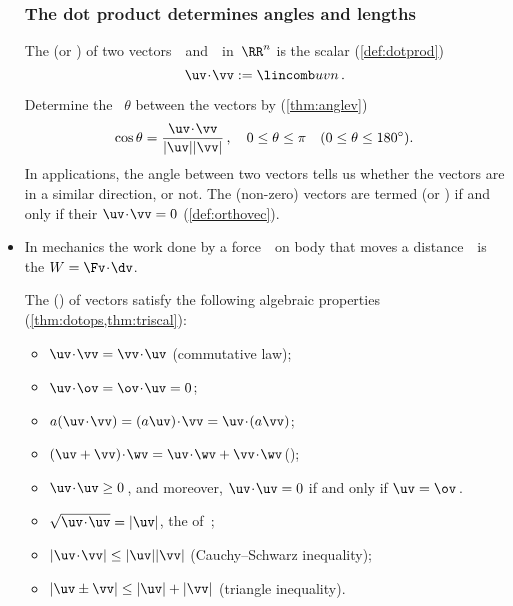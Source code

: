 \begin{itemize}
\subsubsection{The dot product determines angles and lengths}

\itemhi The  (or ) of two vectors~\uv\ and~\vv\ in~\(\RR^n\) is the scalar (\autoref{def:dotprod})
\begin{equation*}
\uv\cdot \vv:= \lincomb uvn\,.
\end{equation*}
\begin{itemize}
\itemhi  Determine the ~\(\theta\) between the vectors by (\autoref{thm:anglev})
\begin{equation*}
\cos\theta=\frac{\uv\cdot\vv}{|\uv||\vv|}\,,
\quad 0\leq\theta\leq\pi
\quad (0\leq\theta\leq180^\circ).
\end{equation*}
In applications, the angle between two vectors tells us whether the vectors are in a similar direction, or not.
\itemhi The (non-zero) vectors are termed  (or ) if and only if their  \(\uv\cdot\vv=0\) (\autoref{def:orthovec}).
\end{itemize}

\item In mechanics the work done by a force~\Fv\ on body that moves a distance~\dv\ is the  \(W=\Fv\cdot\dv\).

\itemme The  () of vectors 
satisfy the following algebraic properties (\cref{thm:dotops,thm:triscal}):
\begin{itemize}
\item \(\uv\cdot\vv=\vv\cdot\uv\) \quad({commutative law});
\item \(\uv\cdot\ov=\ov\cdot\uv=0\);
\item \(a(\uv\cdot\vv)=(a\uv)\cdot\vv=\uv\cdot(a\vv)\);
\item \((\uv+\vv)\cdot\wv=\uv\cdot\wv+\vv\cdot\wv\)\quad();
\item \(\uv\cdot\uv\geq0\)\,, and moreover, \(\uv\cdot\uv=0\) if and only if \(\uv=\ov\)\,.
\item \(\sqrt{\uv\cdot\uv}=|\uv|\), the  of~\uv;
\item \(|\uv\cdot\vv|\leq|\uv||\vv|\) ({Cauchy--Schwarz inequality});
\item \(|\uv\pm\vv|\leq|\uv|+|\vv|\) ({triangle inequality}).
\end{itemize}


\end{itemize}
